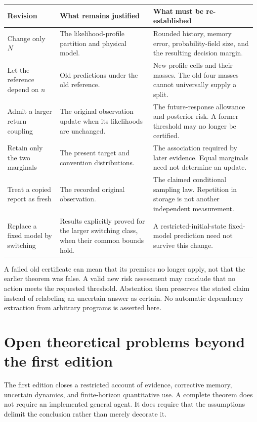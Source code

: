 \documentclass[11pt,letterpaper]{article}
\theoremstyle{plain}
\theoremstyle{definition}
\begin{document}
\begin{center}\small
\begin{tabularx}{\textwidth}{@{}P{.25\textwidth}YY@{}}\toprule
Revision & What remains justified & What must be re-established\\\midrule
Change only $N$ & The likelihood-profile partition and physical model. & Rounded history, memory error, probability-field size, and the resulting decision margin.\\
Let the reference depend on $n$ & Old predictions under the old reference. & New profile cells and their masses. The old four masses cannot universally supply a split.\\
Admit a larger return coupling & The original observation update when its likelihoods are unchanged. & The future-response allowance and posterior risk. A former threshold may no longer be certified.\\
Retain only the two marginals & The present target and convention distributions. & The association required by later evidence. Equal marginals need not determine an update.\\
Treat a copied report as fresh & The recorded original observation. & The claimed conditional sampling law. Repetition in storage is not another independent measurement.\\
Replace a fixed model by switching & Results explicitly proved for the larger switching class, when their common bounds hold. & A restricted-initial-state fixed-model prediction need not survive this change.\\\bottomrule
\end{tabularx}
\end{center}

A failed old certificate can mean that its premises no longer apply, not that the earlier theorem was false. A valid new risk assessment may conclude that no action meets the requested threshold. Abstention then preserves the stated claim instead of relabeling an uncertain answer as certain. No automatic dependency extraction from arbitrary programs is asserted here.

\section{Open theoretical problems beyond the first edition}\label{sec:open}
The first edition closes a restricted account of evidence, corrective memory, uncertain dynamics, and finite-horizon quantitative use. A complete theorem does not require an implemented general agent. It does require that the assumptions delimit the conclusion rather than merely decorate it.
\end{document}
